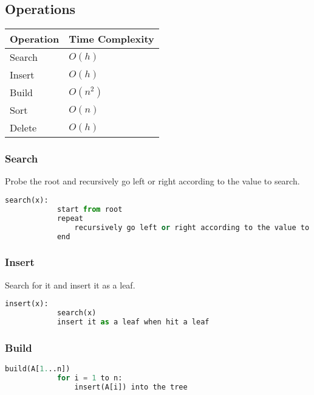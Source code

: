 \documentclass{article}
\begin{document}
\subsection{Operations}
\begin{summary}
    \begin{center}
        \begin{tabular}{p{8cm} p{8cm}}
            \hline
            \textbf{Operation} & \textbf{Time Complexity} \\ \hline
            Search                & $O(h)$              \\ \hline
            Insert               & $O(h)$                \\ \hline
            Build & $O(n^2)$ \\ \hline
            Sort & $O(n)$ \\ \hline
            Delete & $O(h)$ \\ \hline 
        \end{tabular}    
    \end{center}
\end{summary}

\subsubsection{Search}
\begin{algo}
    Probe the root and recursively go left or right according to the value to search.

    \begin{lstlisting}[language=Python]
        search(x):
            start from root
            repeat 
                recursively go left or right according to the value to search
            end
    \end{lstlisting}
\end{algo}

\subsubsection{Insert}
\begin{algo}
    Search for it and insert it as a leaf. 

    \begin{lstlisting}[language=Python]
        insert(x):
            search(x)
            insert it as a leaf when hit a leaf
    \end{lstlisting}
\end{algo}

\subsubsection{Build}
\begin{algo}
    \begin{lstlisting}[language=Python]
        build(A[1...n])
            for i = 1 to n:
                insert(A[i]) into the tree
    \end{lstlisting}
\end{algo}
\end{document}
